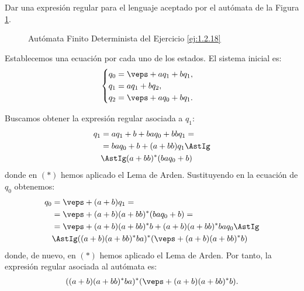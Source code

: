 \begin{ejercicio} \label{ej:1.2.18}
    Dar una expresión regular para el lenguaje aceptado por el autómata de la Figura \ref{fig:ej:1.2.18}.
    \begin{figure}
        \centering
        \caption{Autómata Finito Determinista del Ejercicio \ref{ej:1.2.18}}
        \label{fig:ej:1.2.18}
    \end{figure}

    Establecemos una ecuación por cada uno de los estados. El sistema inicial es:
    \begin{equation*}
        \begin{cases}
            q_0 = \veps + aq_1 + bq_1, \\
            q_1 = aq_1 + bq_2, \\
            q_2 = \veps + aq_0 + bq_1.
        \end{cases}
    \end{equation*}

    Buscamos obtener la expresión regular asociada a $q_1$:
    \begin{align*}
        q_1 &= aq_1 + b + baq_0 +bbq_1=\\
        &= baq_0 + b + (a+bb)q_1\AstIg\\
        &\AstIg (a+bb)^*(baq_0 + b)
    \end{align*}
    donde en $(\ast)$ hemos aplicado el Lema de Arden. Sustituyendo en la ecuación de $q_0$ obtenemos:
    \begin{align*}
        q_0 &= \veps + (a+b)q_1 =\\
        &= \veps + (a+b)(a+bb)^*(baq_0 + b) =\\
        &= \veps + (a+b)(a+bb)^*b + (a+b)(a+bb)^*baq_0 \AstIg\\
        &\AstIg ((a+b)(a+bb)^*ba)^*(\veps + (a+b)(a+bb)^*b)
    \end{align*}
    donde, de nuevo, en $(\ast)$ hemos aplicado el Lema de Arden. Por tanto, la expresión regular asociada al autómata es:
    \begin{align*}
        ((a+b)(a+bb)^*ba)^*(\veps + (a+b)(a+bb)^*b).
    \end{align*}
\end{ejercicio}


